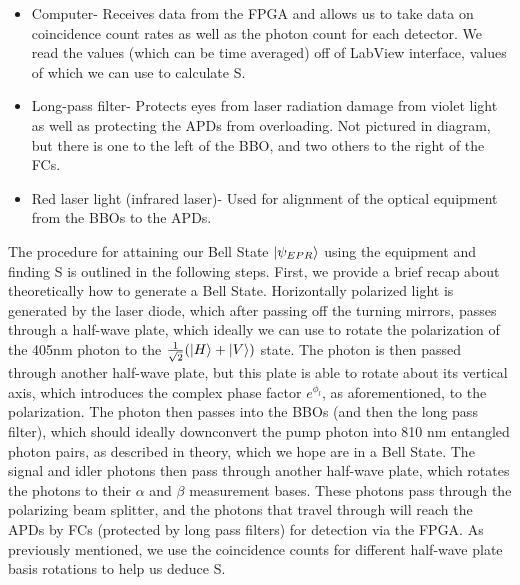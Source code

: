 \documentclass{article}
\begin{document}
\begin{itemize}
        \item Computer- Receives data from the FPGA and allows us to take data on coincidence count rates as well as the photon count for each detector. We read the values (which can be time averaged) off of LabView interface, values of which we can use to calculate S.
        \item Long-pass filter- Protects eyes from laser radiation damage from violet light as well as protecting the APDs from overloading. Not pictured in diagram, but there is one to the left of the BBO, and two others to the right of the FCs.
        \item Red laser light (infrared laser)- Used for alignment of the optical equipment from the BBOs to the APDs.
    \end{itemize}
    The procedure for attaining our Bell State $\left\vert{\psi_{EPR}}\right\rangle$ using the equipment and finding S is outlined in the following steps. First, we provide a brief recap about theoretically how to generate a Bell State. Horizontally polarized light is generated by the laser diode, which after passing off the turning mirrors, passes through a half-wave plate, which ideally we can use to rotate the polarization of the 405nm photon to the $\frac{1}{\sqrt{2}}(\left\vert{H}\right\rangle+\left\vert{V}\right\rangle)$ state. The photon is then passed through another half-wave plate, but this plate is able to rotate about its vertical axis, which introduces the complex phase factor $e^{\phi_l}$, as aforementioned, to the polarization. The photon then passes into the BBOs (and then the long pass filter), which should ideally downconvert the pump photon into 810 nm entangled photon pairs, as described in theory, which we hope are in a Bell State. The signal and idler photons then pass through another half-wave plate, which rotates the photons to their $\alpha$ and $\beta$ measurement bases. These photons pass through the polarizing beam splitter, and the photons that travel through will reach the APDs by FCs (protected by long pass filters) for detection via the FPGA. As previously mentioned, we use the coincidence counts for different half-wave plate basis rotations to help us deduce S.
\end{document}
